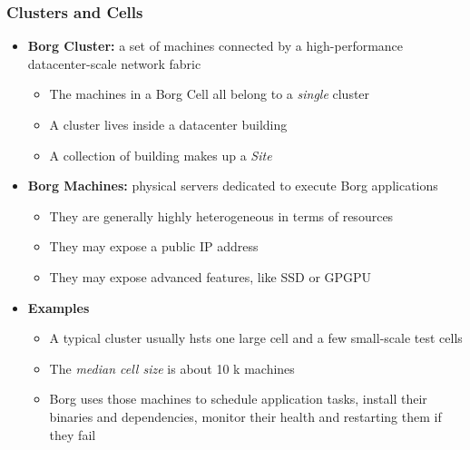 \begin{frame}
\frametitle{Clusters and Cells}
\begin{itemize}
	\item {\bf Borg Cluster:} a set of machines connected by a high-performance datacenter-scale network fabric
	\begin{itemize}
		\item The machines in a Borg Cell all belong to a {\it single} cluster
		\item A cluster lives inside a datacenter building
		\item A collection of building makes up a {\it Site}
	\end{itemize}
	\item {\bf Borg Machines:} physical servers dedicated to execute Borg applications
	\begin{itemize}
		\item They are generally highly heterogeneous in terms of resources
		\item They may expose a public IP address
		\item They may expose advanced features, like SSD or GPGPU
	\end{itemize}
	\item {\bf Examples}
	\begin{itemize}
		\item A typical cluster usually hsts one large cell and a few small-scale test cells
		\item The {\it median cell size} is about 10 k machines
		\item Borg uses those machines to schedule application tasks, install their binaries and dependencies, monitor their health and restarting them if they fail
	\end{itemize}
\end{itemize}
\end{frame}

